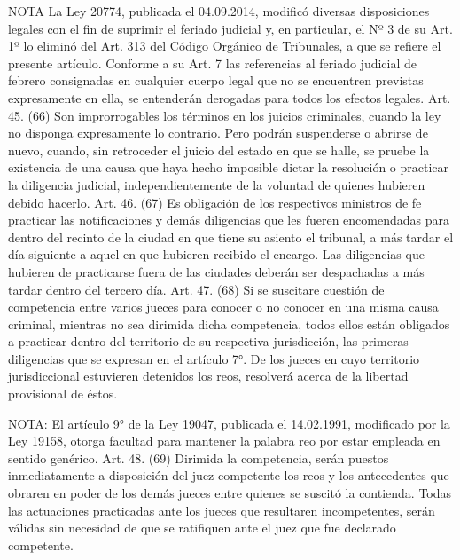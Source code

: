 NOTA
      La Ley 20774, publicada el 04.09.2014, modificó diversas disposiciones legales con el fin de suprimir el feriado judicial y, en particular, el Nº 3 de su Art. 1º lo eliminó del Art. 313 del Código Orgánico de Tribunales, a que se refiere el presente artículo. Conforme a su Art. 7 las referencias al feriado judicial de febrero consignadas en cualquier cuerpo legal que no se encuentren previstas expresamente en ella, se entenderán derogadas para todos los efectos legales.
    Art. 45. (66) Son improrrogables los términos en los juicios criminales, cuando la ley no disponga expresamente lo contrario.
    Pero podrán suspenderse o abrirse de nuevo, cuando, sin retroceder el juicio del estado en que se halle, se pruebe la existencia de una causa que haya hecho imposible dictar la resolución o practicar la diligencia judicial, independientemente de la voluntad de quienes hubieren debido hacerlo.
    Art. 46. (67) Es obligación de los respectivos ministros de fe practicar las notificaciones y demás diligencias que les fueren encomendadas para dentro del recinto de la ciudad en que tiene su asiento el tribunal, a más tardar el día siguiente a aquel en que hubieren recibido el encargo.
    Las diligencias que hubieren de practicarse fuera de las ciudades deberán ser despachadas a más tardar dentro del tercero día.
    Art. 47. (68) Si se suscitare cuestión de competencia entre varios jueces para conocer o no conocer en una misma causa criminal, mientras no sea dirimida dicha competencia, todos ellos están obligados a practicar dentro del territorio de su respectiva jurisdicción, las primeras diligencias que se expresan en el artículo 7°.
    De los jueces en cuyo territorio jurisdiccional estuvieren detenidos los reos, resolverá acerca de la libertad provisional de éstos.



NOTA:
      El artículo 9° de la Ley 19047, publicada el 14.02.1991, modificado por la Ley 19158, otorga facultad para mantener la palabra reo por estar empleada en sentido genérico.
    Art. 48. (69) Dirimida la competencia, serán puestos inmediatamente a disposición del juez competente los reos y los antecedentes que obraren en poder de los demás jueces entre quienes se suscitó la contienda.
    Todas las actuaciones practicadas ante los jueces que resultaren incompetentes, serán válidas sin necesidad de que se ratifiquen ante el juez que fue declarado competente.



